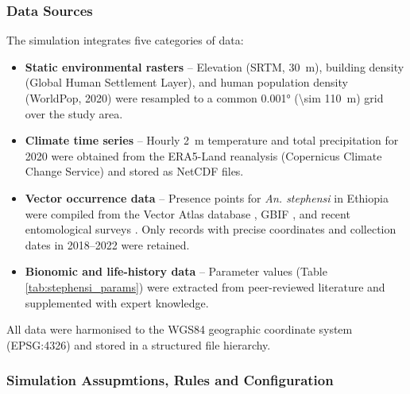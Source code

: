 \documentclass{article}
\begin{document}
\subsubsection{Data Sources}

\label{sec:data_sources}
The simulation integrates five categories of data:

\begin{itemize}
    \item \textbf{Static environmental rasters} -- Elevation (SRTM, \SI{30}{\meter}), building density (Global 
	Human Settlement Layer), and human population density (WorldPop, 2020) were resampled to a common \ang{0.001} 
	(\SI{\sim 110}{\meter}) grid over the study area.
    
    \item \textbf{Climate time series} -- Hourly \SI{2}{\meter} temperature and total precipitation for 2020 were 
	obtained from the ERA5-Land reanalysis (Copernicus Climate Change Service) and stored as NetCDF files.
    
    \item \textbf{Vector occurrence data} -- Presence points for \textit{An. stephensi} in Ethiopia were compiled from 
	the Vector Atlas database \citep{2025.VE.VAP}, GBIF \citep{2011.AN.BIG}, and recent entomological surveys 
	\citep{2020.MB.GDO, 2021.MB.AUO, 2023.DH.FRO}. Only records with precise coordinates and collection dates 
	in 2018--2022 were retained.
    
    \item \textbf{Bionomic and life-history data} -- Parameter values (Table \ref{tab:stephensi_params}) were extracted 
	from peer-reviewed literature \citep{2022.OC.TIT, 2023.JJ.BBA, 2025.CG.EOT} and supplemented with expert knowledge.
    
\end{itemize}

All data were harmonised to the WGS84 geographic coordinate system (EPSG:4326) and stored in a structured file hierarchy.

\subsubsection{Simulation Assupmtions, Rules and Configuration}
\label{sec:sim_assumptions}
\end{document}
